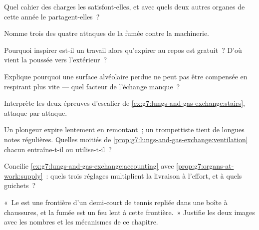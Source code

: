 \begin{exercise}[$\star$]\label{exo:g7:lungs-and-gas-exchange:5}
Quel cahier des charges les  satisfont-elles, et avec quels
deux autres organes de cette année le partagent-elles~?
\end{exercise}

\begin{exercise}[$\star$]\label{exo:g7:lungs-and-gas-exchange:6}
Nomme trois des quatre attaques de la fumée contre la machinerie.
\end{exercise}

\begin{exercise}[$\star\star$]\label{exo:g7:lungs-and-gas-exchange:7}
Pourquoi inspirer est-il un travail alors qu'expirer au repos est
gratuit~? D'où vient la poussée vers l'extérieur~?
\end{exercise}

\begin{exercise}[$\star\star$]\label{exo:g7:lungs-and-gas-exchange:8}
Explique pourquoi une surface alvéolaire perdue ne peut pas être
compensée en respirant plus vite --- quel facteur de l'échange
manque~?
\end{exercise}

\begin{exercise}[$\star\star$]\label{exo:g7:lungs-and-gas-exchange:9}
Interprète les deux épreuves d'escalier de
\cref{ex:g7:lungs-and-gas-exchange:stairs}, attaque par attaque.
\end{exercise}

\begin{exercise}[$\star\star$]\label{exo:g7:lungs-and-gas-exchange:10}
Un plongeur expire lentement en remontant~; un trompettiste tient de
longues notes régulières. Quelles moitiés de
\cref{prop:g7:lungs-and-gas-exchange:ventilation} chacun
entraîne-t-il ou utilise-t-il~?
\end{exercise}

\begin{exercise}[$\star\star$]\label{exo:g7:lungs-and-gas-exchange:11}
Concilie \cref{ex:g7:lungs-and-gas-exchange:accounting} avec
\cref{prop:g7:organs-at-work:supply}~: quels trois réglages
multiplient la livraison à l'effort, et à quels guichets~?
\end{exercise}

\begin{exercise}[$\star\star\star$]\label{exo:g7:lungs-and-gas-exchange:12}
«~Le  est une frontière d'un demi-court de tennis repliée dans
une boîte à chaussures, et la fumée est un feu lent à cette
frontière.~» Justifie les deux images avec les nombres et les
mécanismes de ce chapitre.
\end{exercise}

